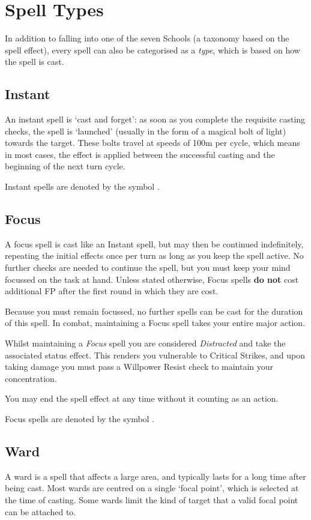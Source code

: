 

\section{Spell Types} 

In addition to falling into one of the seven Schools (a taxonomy based on the spell effect), every spell can also be categorised as a {\it type}, which is based on how the spell is cast. 

\subsection{Instant}

An instant spell is `cast and forget': as soon as you complete the requisite casting checks, the spell is `launched' (usually in the form of a magical bolt of light) towards the target. These bolts travel at speeds of 100m per cycle, which means in most cases, the effect is applied between the successful casting and the beginning of the next turn cycle.

Instant spells are denoted by the symbol \instSymb.

\subsection{Focus}

A focus spell is cast like an Instant spell, but may then be continued indefinitely, repeating the initial effects once per turn as long as you keep the spell active. No further checks are needed to continue the spell, but you must keep your mind focussed on the task at hand. Unless stated otherwise, Focus spells {\bf do not} cost additional FP after the first round in which they are cost. 

Because you must remain focussed, no further spells can be cast for the duration of this spell. In combat, maintaining a Focus spell takes your entire major action.    

Whilst maintaining a {\it Focus} spell you are considered {\it Distracted} and take the associated status effect. This renders you vulnerable to Critical Strikes, and upon taking damage you must pass a Willpower Resist check to maintain your concentration. 

You may end the spell effect at any time without it counting as an action. 

Focus spells are denoted by the symbol \concSymb.

\subsection{Ward}
A ward is a spell that affects a large area, and typically lasts for a long time after being cast. Most wards are centred on a single `focal point', which is selected at the time of casting. Some wards limit the kind of target that a valid focal point can be attached to. 

